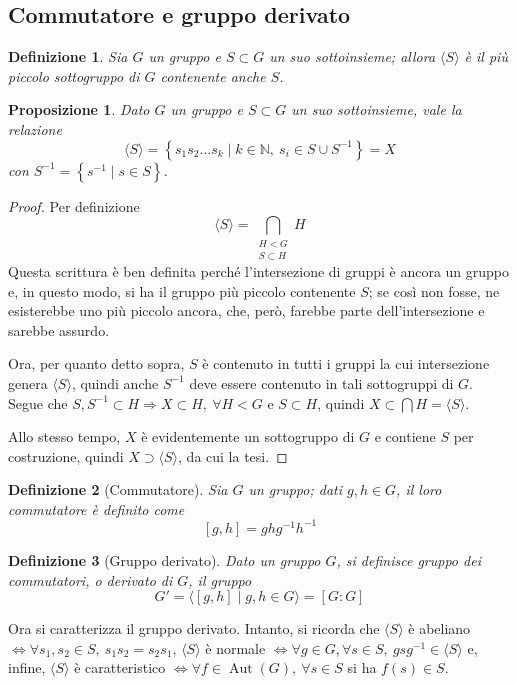 \documentclass[11pt]{article}
\theoremstyle{style}
\newtheorem{definizione}{Definizione}[section]
\newtheorem{prop}{Proposizione}[section]
\numberwithin{equation}{subsection}
\begin{document}
\subsection{Commutatore e gruppo derivato}


\begin{definizione}
	Sia $G$ un gruppo e $S \subset G$ un suo sottoinsieme; allora $\langle S \rangle$ \`e il pi\`u piccolo sottogruppo di $G$ contenente anche $S$.
\end{definizione}
\begin{prop}
	Dato $G$ un gruppo e $S \subset G$ un suo sottoinsieme, vale la relazione
	\[
	\langle S \rangle= \left\{ s_1s_2 \ldots s_k  \mid k \in \mathbb{N}, \ s_i \in S \cup S^{-1} \right\} = X
	\] 
	con $S^{-1}= \left\{ s^{-1}  \mid  s \in S \right\} $.
\end{prop}
	\begin{proof}
		Per definizione
		\[
			\langle S \rangle= \bigcap_{\substack{H < G \\ S \subset H}} H
		\] 
		Questa scrittura \`e ben definita perch\'e l'intersezione di gruppi \`e ancora un gruppo e, in questo modo, si ha il gruppo pi\`u piccolo contenente $S$; se cos\`i non fosse, ne esisterebbe uno pi\`u piccolo ancora, che, per\`o, farebbe parte dell'intersezione e sarebbe assurdo.

		Ora, per quanto detto sopra, $S$ \`e contenuto in tutti i gruppi la cui intersezione genera $\langle S \rangle$, quindi anche $S^{-1} $ deve essere contenuto in tali sottogruppi di $G$.
		Segue che $S,S^{-1}\subset H \Rightarrow X \subset H, \ \forall H < G$ e $S \subset H$, quindi $X \subset \bigcap H = \langle S \rangle$.

		Allo stesso tempo, $X$ \`e evidentemente un sottogruppo di $G$ e contiene $S$ per costruzione, quindi $X \supset \langle S \rangle$, da cui la tesi.
	\end{proof}
\begin{definizione}
	[Commutatore]
	Sia $G$ un gruppo; dati $g,h \in G$, il loro \textit{commutatore} \`e definito come
	\[
		[g,h] = ghg^{-1} h^{-1}
	\] 
\end{definizione}
\begin{definizione}
	[Gruppo derivato]
	Dato un gruppo $G$, si definisce \textit{gruppo dei commutatori}, o \textit{derivato} di $G$, il gruppo 
	\[
		G ' = \langle [g,h]  \mid g,h \in G \rangle = [G:G]
	\] 
\end{definizione}
\noindent Ora si caratterizza il gruppo derivato.
Intanto, si ricorda che $\langle S \rangle$ \`e abeliano $\iff \forall s_1,s_2\in S , \  s_1s_2=s_2s_1$, $\langle S \rangle$ \`e normale $\iff \forall g \in G, \forall s \in S, \ gsg^{-1} \in \langle S \rangle$ e, infine, $\langle S \rangle$ \`e caratteristico $\iff \forall f \in \operatorname{Aut} (G) ,\ \forall s \in S$ si ha $f(s) \in S$.
\end{document}
